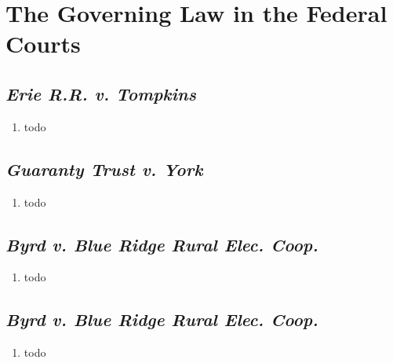 \section{The Governing Law in the Federal Courts}

\subsection{\emph{Erie R.R. v. Tompkins}}

\begin{enumerate}
    \item todo
\end{enumerate}

\subsection{\emph{Guaranty Trust v. York}}

\begin{enumerate}
    \item todo
\end{enumerate}

\subsection{\emph{Byrd v. Blue Ridge Rural Elec. Coop.}}

\begin{enumerate}
    \item todo
\end{enumerate}

\subsection{\emph{Byrd v. Blue Ridge Rural Elec. Coop.}}

\begin{enumerate}
    \item todo
\end{enumerate}
